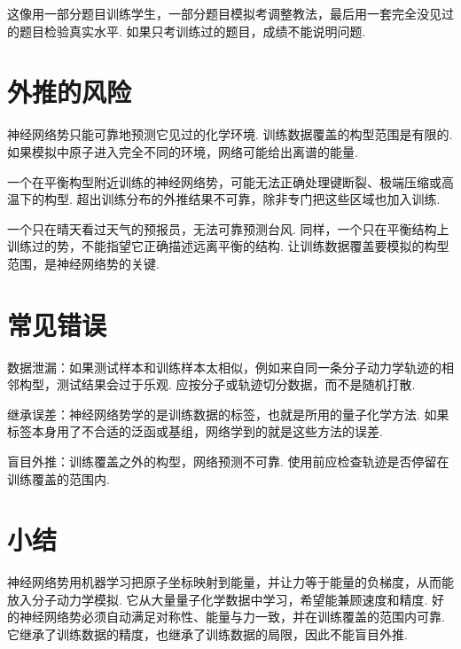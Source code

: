 \documentclass[UTF8,11pt,a4paper,openany]{ctexbook}
\begin{document}
\begin{analogybox}
这像用一部分题目训练学生，一部分题目模拟考调整教法，最后用一套完全没见过的题目检验真实水平. 如果只考训练过的题目，成绩不能说明问题. 
\end{analogybox}

\section{外推的风险}

神经网络势只能可靠地预测它见过的化学环境. 训练数据覆盖的构型范围是有限的. 如果模拟中原子进入完全不同的环境，网络可能给出离谱的能量. 

\begin{limitbox}
一个在平衡构型附近训练的神经网络势，可能无法正确处理键断裂、极端压缩或高温下的构型. 超出训练分布的外推结果不可靠，除非专门把这些区域也加入训练. 
\end{limitbox}

\begin{analogybox}
一个只在晴天看过天气的预报员，无法可靠预测台风. 同样，一个只在平衡结构上训练过的势，不能指望它正确描述远离平衡的结构. 让训练数据覆盖要模拟的构型范围，是神经网络势的关键. 
\end{analogybox}

\section{常见错误}

\begin{limitbox}
数据泄漏：如果测试样本和训练样本太相似，例如来自同一条分子动力学轨迹的相邻构型，测试结果会过于乐观. 应按分子或轨迹切分数据，而不是随机打散. 
\end{limitbox}

\begin{limitbox}
继承误差：神经网络势学的是训练数据的标签，也就是所用的量子化学方法. 如果标签本身用了不合适的泛函或基组，网络学到的就是这些方法的误差. 
\end{limitbox}

\begin{limitbox}
盲目外推：训练覆盖之外的构型，网络预测不可靠. 使用前应检查轨迹是否停留在训练覆盖的范围内. 
\end{limitbox}

\section{小结}

神经网络势用机器学习把原子坐标映射到能量，并让力等于能量的负梯度，从而能放入分子动力学模拟. 它从大量量子化学数据中学习，希望能兼顾速度和精度. 好的神经网络势必须自动满足对称性、能量与力一致，并在训练覆盖的范围内可靠. 它继承了训练数据的精度，也继承了训练数据的局限，因此不能盲目外推. 
\end{document}
